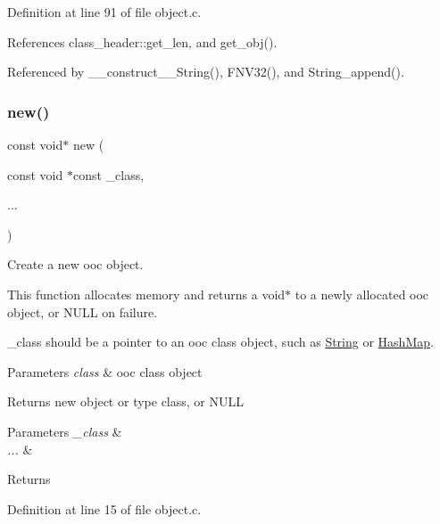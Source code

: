 Definition at line 91 of file object.\+c.



References class\+\_\+header\+::get\+\_\+len, and get\+\_\+obj().



Referenced by \+\_\+\+\_\+construct\+\_\+\+\_\+\+String(), F\+N\+V32(), and String\+\_\+append().

\mbox{\label{group__common_ga621d73ced80293aaecd6839e6bdec30d}} 
\subsubsection{\texorpdfstring{new()}{new()}}
{\footnotesize\ttfamily const void$\ast$ new (\begin{DoxyParamCaption}\item[{const void $\ast$const}]{\+\_\+class,  }\item[{}]{... }\end{DoxyParamCaption})}



Create a new ooc object. 

This function allocates memory and returns a void$\ast$ to a newly allocated ooc object, or N\+U\+LL on failure.

\+\_\+class should be a pointer to an ooc class object, such as \mbox{\hyperlink{structString}{String}} or \mbox{\hyperlink{structHashMap}{Hash\+Map}}. 
\begin{DoxyParams}{Parameters}
{\em class} & ooc class object \\
\hline
\end{DoxyParams}
\begin{DoxyReturn}{Returns}
new object or type class, or N\+U\+LL
\end{DoxyReturn}

\begin{DoxyParams}{Parameters}
{\em \+\_\+class} & \\
\hline
{\em ...} & \\
\hline
\end{DoxyParams}
\begin{DoxyReturn}{Returns}

\end{DoxyReturn}


Definition at line 15 of file object.\+c.



